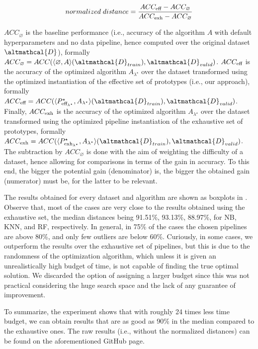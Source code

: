 \begin{equation*}
    normalized\;distance = \frac{ACC_{\textup{eff}} - ACC_{\varnothing}}{ACC_{\textup{exh}} - ACC_{\varnothing}}
\end{equation*}

$ACC_{\varnothing}$ is the baseline performance (i.e., accuracy of the algorithm $A$ with default hyperparameters and no data pipeline, hence computed over the original dataset $\altmathcal{D}$), formally $ACC_{\varnothing} = ACC( \langle \varnothing, A  \rangle (\altmathcal{D}_{train}), \altmathcal{D}_{valid})$.
$ACC_{\textup{eff}}$ is the accuracy of the optimized algorithm $A_{{\lambda}^{\star}}$ over the dataset transformed using the optimized instantiation of the effective set of prototypes (i.e., our approach), formally $ACC_{\textup{eff}} = ACC(\langle P^{\star}_{\textup{eff}_{{\lambda}^{\star}}}, A_{\lambda^\star} \rangle (\altmathcal{D}_{train}), \altmathcal{D}_{valid})$.
Finally, $ACC_{\textup{exh}}$ is the accuracy of the optimized algorithm $A_{{\lambda}^{\star}}$ over the dataset transformed using the optimized pipeline instantiation of the exhaustive set of prototypes, formally $ACC_{\textup{exh}} = ACC(\langle P^{\star}_{\textup{exh}_{{\lambda}^{\star}}}, A_{\lambda^\star} \rangle (\altmathcal{D}_{train}), \altmathcal{D}_{valid})$.
The subtraction by $ACC_{\varnothing}$ is done with the aim of weighting the difficulty of a dataset, hence allowing for comparisons in terms of the gain in accuracy.
To this end, the bigger the potential gain (denominator) is, the bigger the obtained gain (numerator) must be, for the latter to be relevant.

The results obtained for every dataset and algorithm are shown as boxplots in .
Observe that, most of the cases are very close to the results obtained using the exhaustive set, the median distances being 91.51\%, 93.13\%, 88.97\%, for NB, KNN, and RF, respectively.
In general, in 75\% of the cases the chosen pipelines are above 80\%, and only few outliers are below 60\%.
Curiously, in some cases, we outperform the results over the exhaustive set of pipelines, but this is due to the randomness of the optimization algorithm, which unless it is given an unrealistically high budget of time, is not capable of finding the true optimal solution.
We discarded the option of assigning a larger budget since this was not practical considering the huge search space and the lack of any guarantee of improvement.

To summarize, the experiment shows that with roughly 24 times less time budget, we can obtain results that are as good as 90\% in the median compared to the exhaustive ones.
The raw results (i.e., without the normalized distances) can be found on the aforementioned GitHub page.

